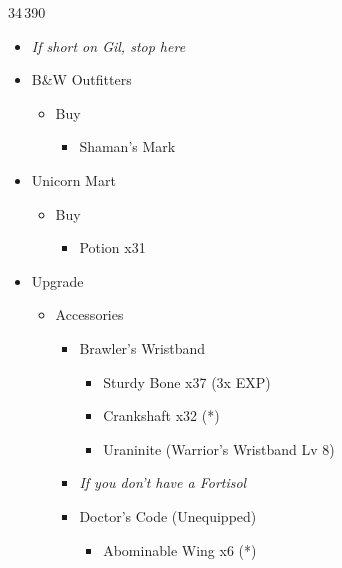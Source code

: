 \begin{multicols}{2}
\begin{shop}{34\,390}
\begin{itemize}
\begin{itemize}
			      \end{itemize}
			\item \textit{If short on Gil, stop here}
			\item B\&W Outfitters
			      \begin{itemize}
				      \item Buy
				            \begin{itemize}
					            \item Shaman's Mark
				            \end{itemize}
			      \end{itemize}
			\item Unicorn Mart
			      \begin{itemize}
				      \item Buy
				            \begin{itemize}
					            \item Potion x31
				            \end{itemize}
			      \end{itemize}
		\end{itemize}
	\end{shop}
	\begin{upgrade}
		\begin{itemize}
			\item Upgrade
			      \begin{itemize}
				      \item Accessories
				            \begin{itemize}
					            \item Brawler's Wristband
					                  \begin{itemize}
						                  \item Sturdy Bone x37 (3x EXP)
						                  \item Crankshaft x32 (*)
						                  \item Uraninite (Warrior's Wristband Lv 8)
					                  \end{itemize}
					            \item \textit{If you don't have a Fortisol}
					            \item Doctor's Code (Unequipped)
					                  \begin{itemize}
						                  \item Abominable Wing x6 (*)
					                  \end{itemize}
				            \end{itemize}

\end{itemize}
\end{itemize}
\end{upgrade}
\end{multicols}
